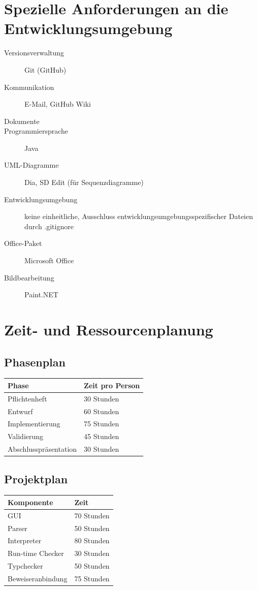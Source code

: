 \documentclass[a4paper,10pt]{article}
\begin{document}
\section{Spezielle Anforderungen an die Entwicklungsumgebung}
\begin{description}
  \item[Versionsverwaltung] Git (GitHub)
  \item[Kommunikation] E-Mail, GitHub Wiki
  \item[Dokumente] \LaTeXe
  \item[Programmiersprache] Java
  \item[UML-Diagramme] Dia, SD Edit (f\"{u}r Sequenzdiagramme)
  \item[Entwicklungsumgebung] keine einheitliche, Ausschluss entwicklungsumgebungsspezifischer Dateien durch .gitignore
  \item[Office-Paket] Microsoft Office
  \item[Bildbearbeitung] Paint.NET
\end{description}

\section{Zeit- und Ressourcenplanung}
\subsection{Phasenplan}
\begin{tabular}[h]{| l | l |}
\hline
\textbf{Phase} & \textbf{Zeit pro Person}\\
\hline
Pflichtenheft & 30 Stunden\\
Entwurf & 60 Stunden\\
Implementierung & 75 Stunden\\
Validierung & 45 Stunden\\
Abschlusspr\"{a}sentation & 30 Stunden\\
\hline
\end{tabular}

\subsection{Projektplan}
\begin{tabular}[h]{| l | l |}
\hline
\textbf{Komponente} & \textbf{Zeit}\\
\hline
GUI & 70 Stunden\\
Parser & 50 Stunden\\
Interpreter & 80 Stunden\\
Run-time Checker & 30 Stunden\\
Typchecker & 50 Stunden\\
Beweiseranbindung & 75 Stunden\\
\hline
\end{tabular}
\end{document}
